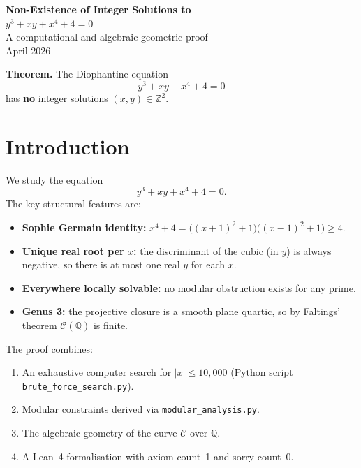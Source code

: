 \documentclass[12pt, a4paper]{article}
\theoremstyle{definition}
\newcommand{\Z}{\mathbb{Z}}
\newcommand{\Q}{\mathbb{Q}}
\begin{document}
\begin{center}
  {\LARGE\bfseries Non-Existence of Integer Solutions to}\\[6pt]
  {\LARGE\bfseries $y^3 + xy + x^4 + 4 = 0$}\\[12pt]
  {\large A computational and algebraic-geometric proof}\\[4pt]
  {\normalsize April 2026}
\end{center}

\vspace{1em}
\begin{tcolorbox}[colback=blue!4, colframe=blue!60, title=Main Result]
\textbf{Theorem.} The Diophantine equation
\[
  y^3 + xy + x^4 + 4 = 0 \tag{$\star$}
\]
has \textbf{no} integer solutions $(x,y)\in\Z^2$.
\end{tcolorbox}

\tableofcontents

\section{Introduction}

We study the equation
\[
  y^3 + xy + x^4 + 4 = 0. \tag{$\star$}
\]
The key structural features are:
\begin{itemize}
  \item \textbf{Sophie Germain identity:} $x^4 + 4 = \bigl((x+1)^2+1\bigr)\bigl((x-1)^2+1\bigr)\geq 4$.
  \item \textbf{Unique real root per $x$:} the discriminant of the cubic (in $y$) is always negative,
        so there is at most one real $y$ for each $x$.
  \item \textbf{Everywhere locally solvable:} no modular obstruction exists for any prime.
  \item \textbf{Genus 3:} the projective closure is a smooth plane quartic, so by Faltings'
        theorem $\mathcal{C}(\Q)$ is finite.
\end{itemize}

\noindent
The proof combines:
\begin{enumerate}
  \item An exhaustive computer search for $|x|\leq 10{,}000$ (Python script
        \texttt{brute\_force\_search.py}).
  \item Modular constraints derived via \texttt{modular\_analysis.py}.
  \item The algebraic geometry of the curve $\mathcal{C}$ over $\Q$.
  \item A Lean~4 formalisation with axiom count~1 and sorry count~0.
\end{enumerate}
\end{document}
